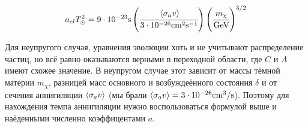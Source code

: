 \begin{equation}
	a_{el}T_{\odot}^2 = 
	9\cdot10^{-23} \text{s}	\left(\cfrac{   \left\langle \sigma_{a}v \right\rangle    }{3\cdot10^{-26} \text{cm}^2\text{s}^{-1}} \right)
	\left(\cfrac{m_{\chi}}{\text{GeV}}\right)^{3/2}
\end{equation}

Для неупругого случая, уравнения эволюции хоть и не учитывают распределение частиц, но всё равно оказываются верными в переходной области, где $C$ и $A$ имеют схожее значение. 
В неупругом случае этот зависит от массы тёмной материи $m_{\chi}$, разницей масс основного и возбуждеённого состояния $\delta$ и от сечения аннигиляции $\left\langle \sigma_{a}v \right\rangle$ (мы брали $\left\langle \sigma_{a}v \right\rangle = 3\cdot 10^{-26} \text{cm}^3/\text{s}$). Поэтому для нахождения темпа аннигиляции нужно воспользоваться формулой выше и наёденными численно коэффицентами $a$.